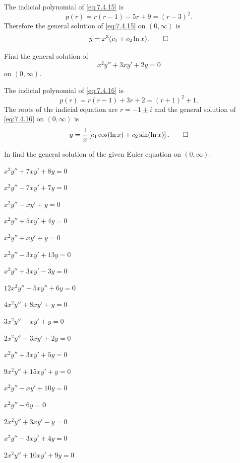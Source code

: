 \begin{solution}
  The indicial polynomial of \eqref{eq:7.4.15} is
\[
p(r)=r(r-1)-5r+9=(r-3)^2.
\]
Therefore the general solution of \eqref{eq:7.4.15} on $(0,\infty)$ is
\[
y=x^3(c_1+c_2 \ln x).\qedhere
\]
\end{solution}

\begin{example}\label{example:7.4.7}
  Find the general solution of
\begin{equation} \label{eq:7.4.16}
x^2y''+3xy'+2y=0
\end{equation}
on  $(0,\infty)$.
\end{example}

\begin{solution}
The indicial polynomial of \eqref{eq:7.4.16} is
\[
p(r)=r(r-1)+3r+2=(r+1)^2+1.
\]
The roots of the indicial equation are $r=-1 \pm i$ and the general
solution of \eqref{eq:7.4.16} on $(0,\infty)$ is
\[
y=\frac{1}{x}\left[c_1\cos(\ln x)+c_2\sin(\ln x)\right].\qedhere
\]
\end{solution}

\exercises
In  find the general solution of
the given Euler equation on $(0,\infty)$.

\begin{exerciselistTwoColumn}

\item\label{exer:7.4.1}$x^2y''+7xy'+8y=0$
\item\label{exer:7.4.2}$x^2y''-7xy'+7y=0$
\item\label{exer:7.4.3}$x^2y''-xy'+y=0$
\item\label{exer:7.4.4}$x^2y''+5xy'+4y=0$
\item\label{exer:7.4.5}$x^2y''+xy'+y=0$
\item\label{exer:7.4.6}$x^2y''-3xy'+13y=0$
\item\label{exer:7.4.7}$x^2y''+3xy'-3y=0$%
\item\label{exer:7.4.8}$12x^2y''-5xy''+6y=0$
\item\label{exer:7.4.9}$4x^2y''+8xy'+y=0$%
\item\label{exer:7.4.10}$3x^2y''-xy'+y=0$
\item\label{exer:7.4.11}$2x^2y''-3xy'+2y=0$%
\item\label{exer:7.4.12}$x^2y''+3xy'+5y=0$
\item\label{exer:7.4.13}$9x^2y''+15xy'+y=0$%
\item\label{exer:7.4.14}$x^2y''-xy'+10y=0$
\item\label{exer:7.4.15}$x^2y''-6y=0$%
\item\label{exer:7.4.16}$2x^2y''+3xy'-y=0$
\item\label{exer:7.4.17}$x^2y''-3xy'+4y=0$%
\item\label{exer:7.4.18}$2x^2y''+10xy'+9y=0$
\end{exerciselistTwoColumn}

